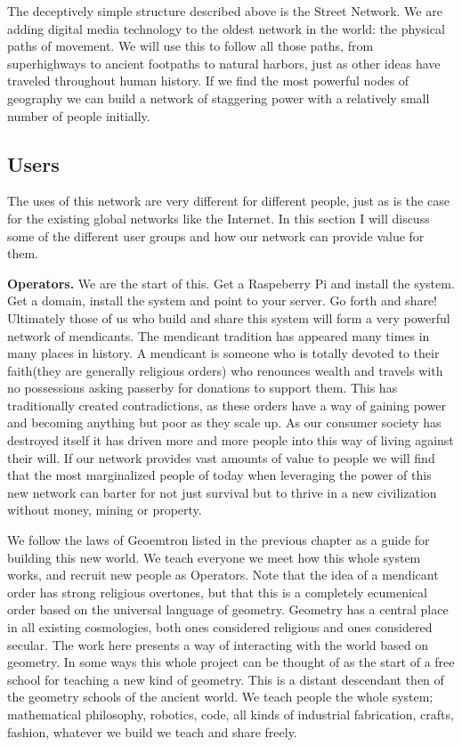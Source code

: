 The deceptively simple structure described above is the Street Network.  We are adding digital media technology to the oldest network in the world: the physical paths of movement.  We will use this to follow all those paths, from  superhighways to ancient footpaths to natural harbors, just as other ideas have traveled throughout human history.  If we find the most powerful nodes of geography we can build a network of staggering power with a relatively small number of people initially.


\subsection{Users}

The uses of this network are very different for different people, just as is the case for the existing global networks like the Internet. In this section I will discuss some of the different user groups and how our network can provide value for them.

\textbf{Operators.} We are the start of this.  Get a Raspeberry Pi and install the system. Get a domain, install the system and point to your server.  Go forth and share! Ultimately those of us who build and share this system will form a very powerful network of mendicants.  The mendicant tradition has appeared many times in many places in history.  A mendicant is someone who is totally devoted to their faith(they are generally religious orders) who renounces wealth and travels with no possessions asking passerby for donations to support them.  This has traditionally created contradictions, as these orders have a way of gaining power and becoming anything but poor as they scale up.  As our consumer society has destroyed itself it has driven more and more people into this way of living against their will.  If our network provides vast amounts of value to people we will find that the most marginalized people of today when leveraging the power of this new network can barter for not just survival but to thrive in a new civilization without money, mining or property.  

We follow the laws of Geoemtron listed in the previous chapter as a guide for building this new world.  We teach everyone we meet how this whole system works, and recruit new people as Operators.  Note that the idea of a mendicant order has strong religious overtones, but that this is a completely ecumenical order based on the universal language of geometry.  Geometry has a central place in all existing cosmologies, both ones considered religious and ones considered secular.  The work here presents a way of interacting with the world based on geometry.  In some ways this whole project can be thought of as the start of a free school for teaching a new kind of geometry.  This is a distant descendant then of the geometry schools of the ancient world.  We teach people the whole system; mathematical philosophy, robotics, code, all kinds of industrial fabrication, crafts, fashion, whatever we build we teach and share freely.  

